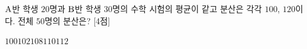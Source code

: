$\mathrm{A}$반 학생 $20$명과 $\mathrm{B}$반 학생 $30$명의 수학 시험의 평균이 같고 분산은 각각 $100$, $120$이다. 전체 $50$명의 분산은? \mbox{[4점]}
\begin{choices32}{$100$}{$102$}{$108$}{$110$}{$112$}\end{choices32}
